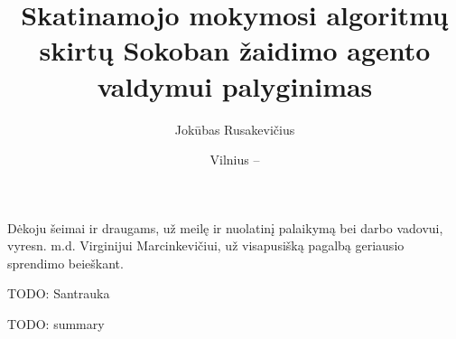 \documentclass{VUMIFPSbakalaurinis}
\title{Skatinamojo mokymosi algoritmų skirtų Sokoban žaidimo agento valdymui palyginimas}
\author{Jokūbas Rusakevičius}
\date{Vilnius – \the\year}
\begin{document}
\maketitle
\setcounter{page}{2}

\sectionnonumnocontent{}
\vspace{7cm}
\begin{center}
Dėkoju šeimai ir draugams, už meilę ir nuolatinį palaikymą bei darbo vadovui, vyresn. m.d. Virginijui Marcinkevičiui, už visapusišką pagalbą geriausio sprendimo beieškant.
\end{center}


TODO: Santrauka

TODO: summary

\tableofcontents
\end{document}
